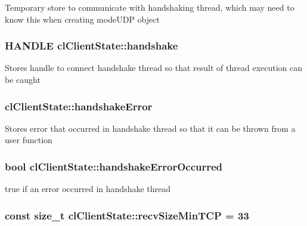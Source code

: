 \label{classcl_client_state_ab8feb66a89295b2ee744245aad8e86ba}
Temporary store to communicate with handshaking thread, which may need to know this when creating modeUDP object \hypertarget{classcl_client_state_a8a137584141df71f35ef6af70d1ec365}{
\subsubsection[{handshake}]{\setlength{\rightskip}{0pt plus 5cm}HANDLE {\bf clClientState::handshake}}}
\label{classcl_client_state_a8a137584141df71f35ef6af70d1ec365}
Stores handle to connect handshake thread so that result of thread execution can be caught \hypertarget{classcl_client_state_ad6d910b86977c982fe7d60689289fada}{
\subsubsection[{handshakeError}]{ {\bf clClientState::handshakeError}}}
\label{classcl_client_state_ad6d910b86977c982fe7d60689289fada}
Stores error that occurred in handshake thread so that it can be thrown from a user function \hypertarget{classcl_client_state_a5d655bd30abb4dc85baf932cafec8d41}{
\subsubsection[{handshakeErrorOccurred}]{\setlength{\rightskip}{0pt plus 5cm}bool {\bf clClientState::handshakeErrorOccurred}}}
\label{classcl_client_state_a5d655bd30abb4dc85baf932cafec8d41}
true if an error occurred in handshake thread \hypertarget{classcl_client_state_ac4ab48651bcfd9249d396771f9bb7f58}{
\subsubsection[{recvSizeMinTCP}]{\setlength{\rightskip}{0pt plus 5cm}const size\_\-t {\bf clClientState::recvSizeMinTCP} = 33}}
